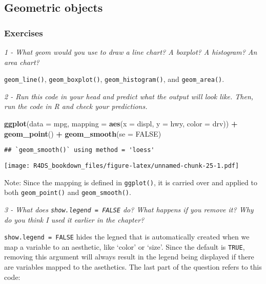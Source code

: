 \documentclass[]{article}
\newenvironment{Shaded}{\begin{snugshade}}{\end{snugshade}}
\newcommand{\KeywordTok}[1]{\textcolor[rgb]{0.13,0.29,0.53}{\textbf{#1}}}
\newcommand{\DataTypeTok}[1]{\textcolor[rgb]{0.13,0.29,0.53}{#1}}
\newcommand{\StringTok}[1]{\textcolor[rgb]{0.31,0.60,0.02}{#1}}
\newcommand{\OtherTok}[1]{\textcolor[rgb]{0.56,0.35,0.01}{#1}}
\newcommand{\OperatorTok}[1]{\textcolor[rgb]{0.81,0.36,0.00}{\textbf{#1}}}
\newcommand{\NormalTok}[1]{#1}
\theoremstyle{definition}
\theoremstyle{definition}
\theoremstyle{definition}
\theoremstyle{remark}
\begin{document}
\subsection{Geometric objects}\label{geometric-objects}

\subsubsection{Exercises}\label{exercises-3}

\emph{1 - What geom would you use to draw a line chart? A boxplot? A
histogram? An area chart?}

\texttt{geom\_line()}, \texttt{geom\_boxplot()},
\texttt{geom\_histogram()}, and \texttt{geom\_area()}.

\emph{2 - Run this code in your head and predict what the output will
look like. Then, run the code in R and check your predictions.}

\begin{Shaded}
\begin{Highlighting}[]
\KeywordTok{ggplot}\NormalTok{(}\DataTypeTok{data =}\NormalTok{ mpg, }\DataTypeTok{mapping =} \KeywordTok{aes}\NormalTok{(}\DataTypeTok{x =}\NormalTok{ displ, }\DataTypeTok{y =}\NormalTok{ hwy, }\DataTypeTok{color =}\NormalTok{ drv)) }\OperatorTok{+}\StringTok{ }
\StringTok{  }\KeywordTok{geom_point}\NormalTok{() }\OperatorTok{+}\StringTok{ }
\StringTok{  }\KeywordTok{geom_smooth}\NormalTok{(}\DataTypeTok{se =} \OtherTok{FALSE}\NormalTok{)}
\end{Highlighting}
\end{Shaded}

\begin{verbatim}
## `geom_smooth()` using method = 'loess'
\end{verbatim}

\texttt{[image: R4DS\_bookdown\_files/figure-latex/unnamed-chunk-25-1.pdf]}

Note: Since the mapping is defined in \texttt{ggplot()}, it is carried
over and applied to both \texttt{geom\_point()} and
\texttt{geom\_smooth()}.

\emph{3 - What does \texttt{show.legend\ =\ FALSE} do? What happens if
you remove it? Why do you think I used it earlier in the chapter?}

\texttt{show.legend\ =\ FALSE} hides the legned that is automatically
created when we map a variable to an aesthetic, like `color' or `size'.
Since the default is \texttt{TRUE}, removing this argument will always
result in the legend being displayed if there are variables mapped to
the asethetics. The last part of the question refers to this code:
\end{document}
